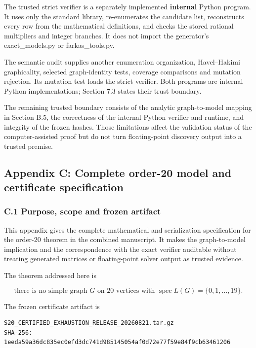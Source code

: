 \documentclass[
  english,
  11pt,
  a4paper,
]{article}
\begin{document}
The trusted strict verifier is a separately implemented
\textbf{internal} Python program. It uses only the standard library,
re-enumerates the candidate list, reconstructs every row from the
mathematical definitions, and checks the stored rational multipliers and
integer branches. It does not import the generator's exact\_models.py or
farkas\_tools.py.

The semantic audit supplies another enumeration organization,
Havel--Hakimi graphicality, selected graph-identity tests, coverage
comparisons and mutation rejection. Its mutation test loads the strict
verifier. Both programs are internal Python implementations; Section 7.3
states their trust boundary.

The remaining trusted boundary consists of the analytic graph-to-model
mapping in Section B.5, the correctness of the internal Python verifier
and runtime, and integrity of the frozen hashes. Those limitations
affect the validation status of the computer-assisted proof but do not
turn floating-point discovery output into a trusted premise.

\subsection{Appendix C: Complete order-20 model and certificate
specification}\label{appendix-c-complete-order-20-model-and-certificate-specification}

\subsubsection{C.1 Purpose, scope and frozen
artifact}\label{c.1-purpose-scope-and-frozen-artifact}

This appendix gives the complete mathematical and serialization
specification for the order-\(20\) theorem in the combined manuscript.
It makes the graph-to-model implication and the correspondence with the
exact verifier auditable without treating generated matrices or
floating-point solver output as trusted evidence.

The theorem addressed here is

\[
\text{there is no simple graph }G\text{ on }20\text{ vertices with }
\operatorname{spec}L(G)=\{0,1,\ldots,19\}.
\]

The frozen certificate artifact is

\begin{verbatim}
S20_CERTIFIED_EXHAUSTION_RELEASE_20260821.tar.gz
SHA-256: 1eeda59a36dc835ec0efd3dc741d985145054af0d72e77f59e84f9cb63461206
\end{verbatim}
\end{document}
